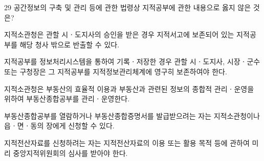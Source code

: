 \begin{question}{29}
공간정보의 구축 및 관리 등에 관한 법령상 지적공부에 관한 내용으로 옳지 않은 것은?
\begin{choices}
  \item 지적소관청은 관할 시ㆍ도지사의 승인을 받은 경우 지적서고에 보존되어 있는 지적공부를 해당 청사 밖으로 반출할 수 있다.
  \item 지적공부를 정보처리시스템을 통하여 기록ㆍ저장한 경우 관할 시ㆍ도지사, 시장ㆍ군수 또는 구청장은 그 지적공부를 지적정보관리체계에 영구히 보존하여야 한다.
  \item 지적소관청은 부동산의 효율적 이용과 부동산과 관련된 정보의 종합적 관리ㆍ운영을 위하여 부동산종합공부를 관리ㆍ운영한다.
  \item 부동산종합공부를 열람하거나 부동산종합증명서를 발급받으려는 자는 지적소관청이나 읍ㆍ면ㆍ동의 장에게 신청할 수 있다.
  \item 지적전산자료를 신청하려는 자는 지적전산자료의 이용 또는 활용 목적 등에 관하여 미리 중앙지적위원회의 심사를 받아야 한다.
\end{choices}
\end{question}
